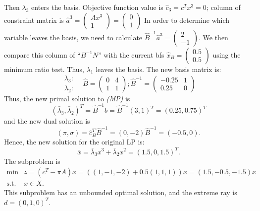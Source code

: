 \begin{itemize}
     Then $\lambda_3$ enters the basis.
     Objective function value is $\hat{c}_3=c^Tx^3=0$;
     column of constraint matrix is
       $\hat{a}^3=\left(\begin{array}{r}Ax^3\\1\end{array}\right)=
          \left(\begin{array}{r}0\\1\end{array}\right)$
     In order to determine which variable leaves the basis,
     we need to calculate 
       $\hat{B}^{-1} \hat{a}^3 = \left(\begin{array}{r}2\\-1\end{array}\right)$.
     We then compare this column of ``$B^{-1}N$'' with the current bfs
     $\hat{x}_B=\left(\begin{array}{r}0.5\\0.5\end{array}\right)$
     using the minimum ratio test.
     Thus, $\lambda_1$ leaves the basis.
     The new basis matrix is:
     \begin{displaymath}
       \begin{array}{c}\lambda_3: \\ \lambda_2: \end{array} \;\;\;
       \hat{B} = \left(\begin{array}{rr}0&4\\1&1\end{array}\right);
        \hat{B}^{-1} = \left(\begin{array}{rr}-0.25&1\\0.25&0\end{array}\right)
     \end{displaymath}
     Thus, the new primal solution to {\em (MP)} is
     \begin{displaymath}
      (\bar{\lambda}_3,\bar{\lambda}_2)^T = 
       \hat{B}^{-1} \hat{b} = \hat{B}^{-1} (3,1)^T = (0.25,0.75)^T
     \end{displaymath}
     and the new dual solution is
     \begin{displaymath}
       (\pi,\sigma) = \hat{c}^T_B \hat{B}^{-1} = (0,-2) \hat{B}^{-1} = (-0.5,0).
     \end{displaymath}
     Hence, the new solution for the original LP is:
     \begin{displaymath}
       \bar{x} = \bar{\lambda}_3 x^3 + \bar{\lambda}_2 x^2 = (1.5,0,1.5)^T.
     \end{displaymath}
     The subproblem is
     \begin{displaymath}
       \begin{array}{lc}
       \min & z = (c^T - \pi A) x = ((1,-1,-2)+0.5(1,1,1))x=(1.5,-0.5,-1.5)x \\
          \mbox{s.t. }  & x \in X.
       \end{array}
     \end{displaymath}
     This subproblem has an unbounded optimal solution, and the extreme ray is
     $d=(0,1,0)^T$.


\end{itemize}
